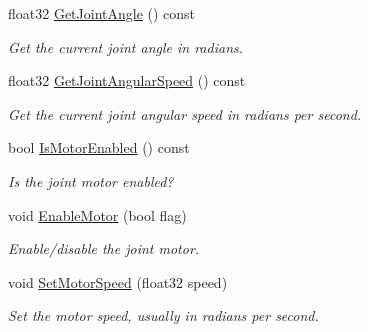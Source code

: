 \begin{DoxyCompactItemize}
\mbox{\label{classb2_wheel_joint_a3ea115dde9bad34d23fd59068734824a}} 
float32 \hyperlink{classb2_wheel_joint_a3ea115dde9bad34d23fd59068734824a}{Get\+Joint\+Angle} () const
\begin{DoxyCompactList}\small\item\em Get the current joint angle in radians. \end{DoxyCompactList}\item 
\mbox{\label{classb2_wheel_joint_aaf5a4e3713ceca98c2afda950e67ff9d}} 
float32 \hyperlink{classb2_wheel_joint_aaf5a4e3713ceca98c2afda950e67ff9d}{Get\+Joint\+Angular\+Speed} () const
\begin{DoxyCompactList}\small\item\em Get the current joint angular speed in radians per second. \end{DoxyCompactList}\item 
\mbox{\label{classb2_wheel_joint_aef7948a18ec2784397a1d3745824cd78}} 
bool \hyperlink{classb2_wheel_joint_aef7948a18ec2784397a1d3745824cd78}{Is\+Motor\+Enabled} () const
\begin{DoxyCompactList}\small\item\em Is the joint motor enabled? \end{DoxyCompactList}\item 
\mbox{\label{classb2_wheel_joint_a7a832d814bdda135a78fad41ba671da6}} 
void \hyperlink{classb2_wheel_joint_a7a832d814bdda135a78fad41ba671da6}{Enable\+Motor} (bool flag)
\begin{DoxyCompactList}\small\item\em Enable/disable the joint motor. \end{DoxyCompactList}\item 
\mbox{\label{classb2_wheel_joint_a6e3255fcf5c82b979ad7e3dc1c089c0b}} 
void \hyperlink{classb2_wheel_joint_a6e3255fcf5c82b979ad7e3dc1c089c0b}{Set\+Motor\+Speed} (float32 speed)
\begin{DoxyCompactList}\small\item\em Set the motor speed, usually in radians per second. \end{DoxyCompactList}\item 
\mbox{\label{classb2_wheel_joint_a47774ba5dfc1a6a5f15bcc651eea8127}} 

\end{DoxyCompactItemize}
